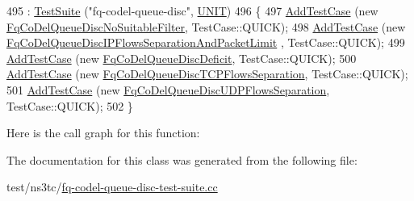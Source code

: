 \begin{DoxyCode}
495   : \hyperlink{classns3_1_1TestSuite_a904b0c40583b744d30908aeb94636d1a}{TestSuite} (\textcolor{stringliteral}{"fq-codel-queue-disc"}, \hyperlink{classns3_1_1TestSuite_a1ebfcab34ec8161e085e8e3a1855eae0a3885375a3787abf60431f8454b3cadbd}{UNIT})
496 \{
497   \hyperlink{classns3_1_1TestCase_a3718088e3eefd5d6454569d2e0ddd835}{AddTestCase} (\textcolor{keyword}{new} \hyperlink{classFqCoDelQueueDiscNoSuitableFilter}{FqCoDelQueueDiscNoSuitableFilter}, 
      TestCase::QUICK);
498   \hyperlink{classns3_1_1TestCase_a3718088e3eefd5d6454569d2e0ddd835}{AddTestCase} (\textcolor{keyword}{new} \hyperlink{classFqCoDelQueueDiscIPFlowsSeparationAndPacketLimit}{FqCoDelQueueDiscIPFlowsSeparationAndPacketLimit}
      , TestCase::QUICK);
499   \hyperlink{classns3_1_1TestCase_a3718088e3eefd5d6454569d2e0ddd835}{AddTestCase} (\textcolor{keyword}{new} \hyperlink{classFqCoDelQueueDiscDeficit}{FqCoDelQueueDiscDeficit}, TestCase::QUICK);
500   \hyperlink{classns3_1_1TestCase_a3718088e3eefd5d6454569d2e0ddd835}{AddTestCase} (\textcolor{keyword}{new} \hyperlink{classFqCoDelQueueDiscTCPFlowsSeparation}{FqCoDelQueueDiscTCPFlowsSeparation}, 
      TestCase::QUICK);
501   \hyperlink{classns3_1_1TestCase_a3718088e3eefd5d6454569d2e0ddd835}{AddTestCase} (\textcolor{keyword}{new} \hyperlink{classFqCoDelQueueDiscUDPFlowsSeparation}{FqCoDelQueueDiscUDPFlowsSeparation}, 
      TestCase::QUICK);
502 \}
\end{DoxyCode}


Here is the call graph for this function\+:




The documentation for this class was generated from the following file\+:\begin{DoxyCompactItemize}
\item 
test/ns3tc/\hyperlink{fq-codel-queue-disc-test-suite_8cc}{fq-\/codel-\/queue-\/disc-\/test-\/suite.\+cc}\end{DoxyCompactItemize}
